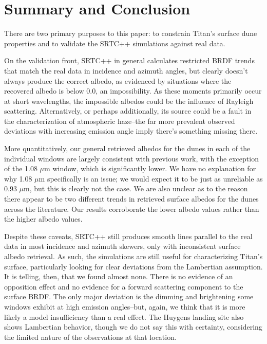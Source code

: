 \documentclass[twocolumn,linenumbers]{aastex631}
\begin{document}
\section{Summary and Conclusion} \label{sec:conclusion}

There are two primary purposes to this paper: to constrain Titan's surface dune properties and to validate the SRTC++ simulations against real data.

On the validation front, SRTC++ in general calculates restricted BRDF trends that match the real data in incidence and azimuth angles, but clearly doesn’t always produce the correct albedo, as evidenced by situations where the recovered albedo is below 0.0, an impossibility. As these moments primarily occur at short wavelengths, the impossible albedos could be the influence of Rayleigh scattering. Alternatively, or perhaps additionally, its source could be a fault in the characterization of atmospheric haze--the far more prevalent observed deviations with increasing emission angle imply there's something missing there.

More quantitatively, our general retrieved albedos for the dunes in each of the individual windows are largely consistent with previous work, with the exception of the 1.08 $\mu$m window, which is significantly lower. We have no explanation for why 1.08 $\mu$m specifically is an issue; we would expect it to be just as unreliable as 0.93 $\mu$m, but this is clearly not the case. We are also unclear as to the reason there appear to be two different trends in retrieved surface albedos for the dunes across the literature. Our results corroborate the lower albedo values rather than the higher albedo values.

Despite these caveats, SRTC++ still produces smooth lines parallel to the real data in most incidence and azimuth skewers, only with inconsistent surface albedo retrieval. As such, the simulations are still useful for characterizing Titan's surface, particularly looking for clear deviations from the Lambertian assumption. It is telling, then, that we found almost none. There is no evidence of an opposition effect and no evidence for a forward scattering component to the surface BRDF. The only major deviation is the dimming and brightening some windows exhibit at high emission angles--but, again, we think that it is more likely a model insufficiency than a real effect. The Huygens landing site also shows Lambertian behavior, though we do not say this with certainty, considering the limited nature of the observations at that location.
\end{document}
